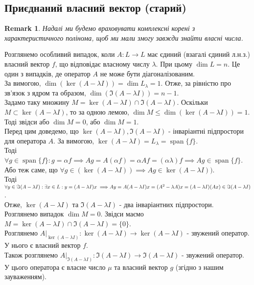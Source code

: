 \documentclass[a4paper, 10pt]{article}
\theoremstyle{theoremdd}
\newtheorem{remark}[theorem]{Remark}
\DeclareMathOperator{\linspan}{span}
\begin{document}
\iffalse
\subsection{Приєднаний власний вектор (старий)}
\begin{remark}
Надалі ми будемо враховувати комплексні корені з характеристичного полінома, щоб ми мали змогу завжди знайти власні числа.
\end{remark}

\iffalse
Розглянемо особливий випадок, коли $A: L \to L$ має єдиний (взагалі єдиний л.н.з.) власний вектор $f$, що відповідає власному числу $\lambda$. При цьому $\dim L = n$. Це один з випадків, де оператор $A$ не може бути діагоналізованим.\\
За вимогою, $\dim (\ker(A - \lambda I)) = \dim L_{\lambda} = 1$. Отже, за рівністю про зв'язок з ядром та образом, $\dim (\Im (A - \lambda I)) = n-1$.\\
Задамо таку множину $M=\ker(A-\lambda I) \cap \Im(A-\lambda I)$. Оскільки $M \subset \ker (A-\lambda I)$, то за одною лемою, $\dim M \leq \dim(\ker (A-\lambda I)) = 1$.
Тоді звідси або $\dim M = 0$, або $\dim M = 1$.
\bigskip \\
Перед цим доведемо, що $\ker(A - \lambda I), \Im(A-\lambda I)$ - інваріантні підпростори для оператора $A$. За вимогою, $\ker(A-\lambda I) = L_{\lambda} = \linspan\{f\}$.\\
Тоді $\forall g \in \linspan\{f\}: g = \alpha f \implies Ag = A(\alpha f) = \alpha Af = (\alpha \lambda) f \implies Ag \in \linspan\{f\}$. Або теж саме, що $\forall g \in (\ker(A - \lambda I)) \implies Ag \in  \ker(A - \lambda I))$.
\bigskip \\
Тоді $\forall y \in \Im(A-\lambda I): \exists x \in L: y = (A-\lambda I)x \implies \\ Ay = A(A-\lambda I)x = (A^2-\lambda A)x = (A-\lambda I)(Ax) \in \Im(A-\lambda I)$.\\
Отже, $\ker(A-\lambda I)$ та $\Im(A-\lambda I)$ - два інваріантних підпростори.
\bigskip \\
Розглянемо випадок $\dim M = 0$. Звідси маємо $M = \ker(A-\lambda I) \cap \Im(A-\lambda I) = \{0\}$.\\
Розглянемо $A |_{\ker(A-\lambda I)}: \ker(A-\lambda I) \to \ker(A-\lambda I)$ - звужений оператор. У нього є власний вектор $f$.\\
Також розглянемо $A |_{\Im(A-\lambda I)}: \Im(A-\lambda I) \to \Im(A-\lambda I)$ - звужений оператор. У цього оператора є власне число $\mu$ та власний вектор $g$ (згідно з нашим зауваженням).\\
\end{document}
